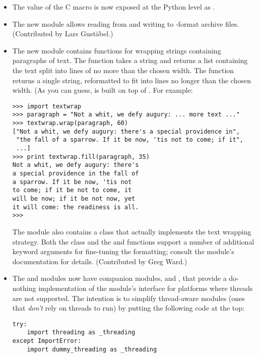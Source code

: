 \documentclass{howto}
\begin{document}
\begin{itemize}
\item The value of the C  macro is now exposed
at the Python level as .

\item The new  module 
allows reading from and writing to -format archive files.
(Contributed by Lars Gust\"abel.)

\item The new  module contains functions for wrapping
strings containing paragraphs of text.  The  function takes a string and returns a list containing
the text split into lines of no more than the chosen width.  The
 function returns a single
string, reformatted to fit into lines no longer than the chosen width.
(As you can guess,  is built on top of
.  For example:

\begin{verbatim}
>>> import textwrap
>>> paragraph = "Not a whit, we defy augury: ... more text ..."
>>> textwrap.wrap(paragraph, 60)
["Not a whit, we defy augury: there's a special providence in",
 "the fall of a sparrow. If it be now, 'tis not to come; if it",
 ...]
>>> print textwrap.fill(paragraph, 35)
Not a whit, we defy augury: there's
a special providence in the fall of
a sparrow. If it be now, 'tis not
to come; if it be not to come, it
will be now; if it be not now, yet
it will come: the readiness is all.
>>>
\end{verbatim}

The module also contains a  class that actually
implements the text wrapping strategy.   Both the
 class and the  and
 functions support a number of additional keyword
arguments for fine-tuning the formatting; consult the module's
documentation for details.
(Contributed by Greg Ward.)

\item The  and  modules now have
companion modules,  and ,
that provide a do-nothing implementation of the 
module's interface for platforms where threads are not supported.  The
intention is to simplify thread-aware modules (ones that \emph{don't}
rely on threads to run) by putting the following code at the top:

\begin{verbatim}
try:
    import threading as _threading
except ImportError:
    import dummy_threading as _threading
\end{verbatim}


\end{itemize}
\end{document}
